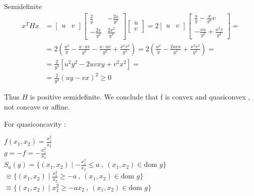 \documentclass{article}
\begin{document}
\noindent Semidefinite \\[0.5em]
\begin{align*}
x^T H x &= \begin{bmatrix} u & v \end{bmatrix} \begin{bmatrix} \frac{2}{y} & -\frac{2x}{y^2} \\ -\frac{2x}{y^2} & \frac{2x^2}{y^3} \end{bmatrix} \begin{bmatrix} u \\ v \end{bmatrix} = 2 \begin{bmatrix} u & v \end{bmatrix} \begin{bmatrix} \frac{u}{y} - \frac{x}{y^2} v \\ -\frac{xu}{y^2} + \frac{x^2 v}{y^3} \end{bmatrix} = \\[1em]
&= 2 \left( \frac{u^2}{y} - \frac{x \cdot uv}{y^2} - \frac{x \cdot uv}{y^2} + \frac{x^2 v^2}{y^3} \right) = 2 \left( \frac{u^2}{y} - \frac{2uvx}{y^2} + \frac{x^2 v^2}{y^3} \right) = \\[1em]
&= \frac{2}{y^3} \left[ u^2 y^2 - 2uvxy + v^2 x^2 \right] = \\[1em]
&= \frac{2}{y^3} (uy - vx)^2 \geq 0
\end{align*}

\vspace{1em}
\noindent Thus $H$ is positive semidefinite.
We conclude that f is convex and quasiconvex ,  not concave or affine. 

\noindent For quasiconcavity : 


\noindent $f(x_1, x_2) = \frac{x_1^2}{x_2}$ \\[1.5em]

\noindent $g = -f = -\frac{x_1^2}{x_2}$ \\[1em]

\noindent $S_a(g) = \{ (x_1, x_2) \mid -\frac{x_1^2}{x_2} \leq a \ , \ (x_1, x_2) \in \text{dom } g \}$ \\[1em]
\indent $\equiv \{ (x_1, x_2) \mid \frac{x_1^2}{x_2} \geq -a \ , \ (x_1, x_2) \in \text{dom } g \}$ \\[1em]
\indent $\equiv \{ (x_1, x_2) \mid x_1^2 \geq -a x_2 \ , \ (x_1, x_2) \in \text{dom } g \}$ \\[2em]
\end{document}
